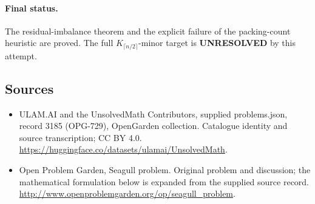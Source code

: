 \documentclass[11pt,a4paper]{article}
\begin{document}
\paragraph{Final status.}
The residual-imbalance theorem and the explicit failure of the packing-count heuristic are proved. The full $K_{\lceil n/2\rceil}$-minor target is \textbf{UNRESOLVED} by this attempt.

\subsection{Sources}
\begin{itemize}
\item[S1] ULAM.AI and the UnsolvedMath Contributors, supplied problems.json, record 3185 (OPG-729), OpenGarden collection. Catalogue identity and source transcription; CC BY 4.0.
\url{https://huggingface.co/datasets/ulamai/UnsolvedMath}.
\item[S2] Open Problem Garden, Seagull problem. Original problem and discussion; the mathematical formulation below is expanded from the supplied source record.
\url{http://www.openproblemgarden.org/op/seagull_problem}.

\end{itemize}
\end{document}
